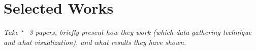 \section{Selected Works}\label{sec:works}
\textit{Take \char`~ 3 papers, briefly present how they work (which data gathering technique and what visualization), and what results they have shown.}

